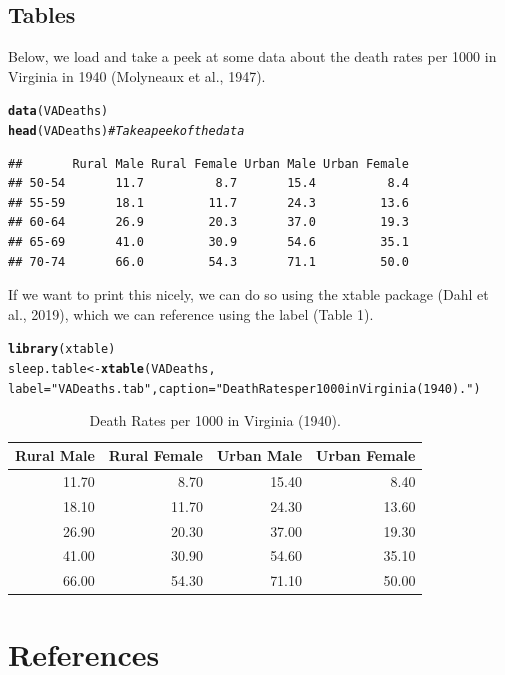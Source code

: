 \documentclass{article}\usepackage[]{graphicx}\usepackage[]{xcolor}
\makeatletter
\newcommand{\hlsng}[1]{\textcolor[rgb]{0.192,0.494,0.8}{#1}}%
\newcommand{\hlcom}[1]{\textcolor[rgb]{0.678,0.584,0.686}{\textit{#1}}}%
\newcommand{\hldef}[1]{\textcolor[rgb]{0.345,0.345,0.345}{#1}}%
\newcommand{\hlkwb}[1]{\textcolor[rgb]{0.69,0.353,0.396}{#1}}%
\newcommand{\hlkwc}[1]{\textcolor[rgb]{0.333,0.667,0.333}{#1}}%
\newcommand{\hlkwd}[1]{\textcolor[rgb]{0.737,0.353,0.396}{\textbf{#1}}}%
\newenvironment{kframe}{%
 \def\at@end@of@kframe{}%
 \ifinner\ifhmode%
  \def\at@end@of@kframe{\end{minipage}}%
  \begin{minipage}{\columnwidth}%
 \fi\fi%
 \def\FrameCommand##1{\hskip\@totalleftmargin \hskip-\fboxsep
 \colorbox{shadecolor}{##1}\hskip-\fboxsep
     \hskip-\linewidth \hskip-\@totalleftmargin \hskip\columnwidth}%
 \MakeFramed {\advance\hsize-\width
   \@totalleftmargin\z@ \linewidth\hsize
   \@setminipage}}%
 {\par\unskip\endMakeFramed%
 \at@end@of@kframe}
\newenvironment{knitrout}{}{} %
\makeatother
\begin{document}
\begin{multicols}{2}
\subsection{Tables}
Below, we load and take a peek at some data about the death rates per 1000 in Virginia in 1940 (Molyneaux et al., 1947).
\begin{knitrout}\scriptsize
{}\color{fgcolor}\begin{kframe}
\begin{alltt}
\hlkwd{data}\hldef{(VADeaths)}
\hlkwd{head}\hldef{(VADeaths)} \hlcom{# Take a peek of the data}
\end{alltt}
\begin{verbatim}
##       Rural Male Rural Female Urban Male Urban Female
## 50-54       11.7          8.7       15.4          8.4
## 55-59       18.1         11.7       24.3         13.6
## 60-64       26.9         20.3       37.0         19.3
## 65-69       41.0         30.9       54.6         35.1
## 70-74       66.0         54.3       71.1         50.0
\end{verbatim}
\end{kframe}
\end{knitrout}
\indent If we want to print this nicely, we can do so using the xtable package (Dahl et al., 2019), which we can reference using the label (Table 1).
\begin{knitrout}\scriptsize
{}\color{fgcolor}\begin{kframe}
\begin{alltt}
\hlkwd{library}\hldef{(xtable)}
\hldef{sleep.table}\hlkwb{<-}\hlkwd{xtable}\hldef{(VADeaths,}
                    \hlkwc{label} \hldef{=} \hlsng{"VADeaths.tab"}\hldef{,} \hlkwc{caption} \hldef{=} \hlsng{"Death Rates per 1000 in Virginia (1940)."}\hldef{)}
\end{alltt}
\end{kframe}
\end{knitrout}
\begin{table}[H]
\centering
\begingroup\small
\begin{tabular}{rrrr}
  \hline
Rural Male & Rural Female & Urban Male & Urban Female \\ 
  \hline
11.70 & 8.70 & 15.40 & 8.40 \\ 
  18.10 & 11.70 & 24.30 & 13.60 \\ 
  26.90 & 20.30 & 37.00 & 19.30 \\ 
  41.00 & 30.90 & 54.60 & 35.10 \\ 
  66.00 & 54.30 & 71.10 & 50.00 \\ 
   \hline
\end{tabular}
\endgroup
\caption{Death Rates per 1000 in Virginia (1940).} 
\label{VADeaths.tab}
\end{table}

\section*{References}
\end{multicols}
\end{document}

